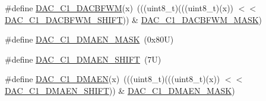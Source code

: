 \begin{DoxyCompactItemize}
\item 
\#define \mbox{\hyperlink{group___d_a_c___register___masks_ga2084f4d4d9fd92156a8011e26ffb55a8}{D\+A\+C\+\_\+\+C1\+\_\+\+D\+A\+C\+B\+F\+WM}}(x)~(((uint8\+\_\+t)(((uint8\+\_\+t)(x)) $<$$<$ \mbox{\hyperlink{group___d_a_c___register___masks_gacc4542331c55b93fe589d439a69122f7}{D\+A\+C\+\_\+\+C1\+\_\+\+D\+A\+C\+B\+F\+W\+M\+\_\+\+S\+H\+I\+FT}})) \& \mbox{\hyperlink{group___d_a_c___register___masks_gaad89dbfc60735cf12eb6cfff9157fffa}{D\+A\+C\+\_\+\+C1\+\_\+\+D\+A\+C\+B\+F\+W\+M\+\_\+\+M\+A\+SK}})
\item 
\#define \mbox{\hyperlink{group___d_a_c___register___masks_ga091be41dfd851b71978ab7298c372292}{D\+A\+C\+\_\+\+C1\+\_\+\+D\+M\+A\+E\+N\+\_\+\+M\+A\+SK}}~(0x80\+U)
\item 
\#define \mbox{\hyperlink{group___d_a_c___register___masks_ga481f558223c5c36402bebe924bdd00a3}{D\+A\+C\+\_\+\+C1\+\_\+\+D\+M\+A\+E\+N\+\_\+\+S\+H\+I\+FT}}~(7\+U)
\item 
\#define \mbox{\hyperlink{group___d_a_c___register___masks_gaa0c71561092dc89347f54d470e2924f0}{D\+A\+C\+\_\+\+C1\+\_\+\+D\+M\+A\+EN}}(x)~(((uint8\+\_\+t)(((uint8\+\_\+t)(x)) $<$$<$ \mbox{\hyperlink{group___d_a_c___register___masks_ga481f558223c5c36402bebe924bdd00a3}{D\+A\+C\+\_\+\+C1\+\_\+\+D\+M\+A\+E\+N\+\_\+\+S\+H\+I\+FT}})) \& \mbox{\hyperlink{group___d_a_c___register___masks_ga091be41dfd851b71978ab7298c372292}{D\+A\+C\+\_\+\+C1\+\_\+\+D\+M\+A\+E\+N\+\_\+\+M\+A\+SK}})
\end{DoxyCompactItemize}
